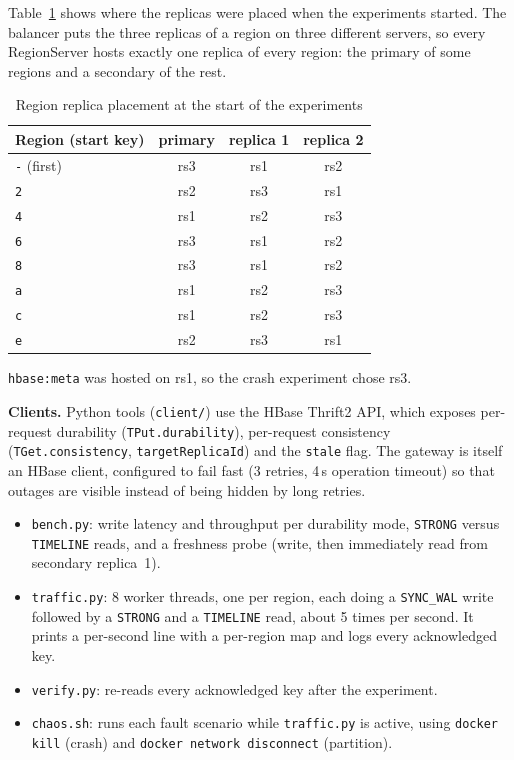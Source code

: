 \documentclass[10pt,twocolumn,letterpaper]{article}
\newcommand{\code}[1]{\texttt{\small #1}}
\begin{document}
Table~\ref{tab:placement} shows where the replicas were placed when the experiments started. The balancer puts the three replicas of a region on three different servers, so every RegionServer hosts exactly one replica of every region: the primary of some regions and a secondary of the rest.

\begin{table}[t]
\caption{Region replica placement at the start of the experiments}\label{tab:placement}
\small
\begin{tabularx}{\columnwidth}{@{}Xccc@{}}
\toprule
Region (start key) & primary & replica 1 & replica 2 \\
\midrule
\code{-} (first) & rs3 & rs1 & rs2 \\
\code{2} & rs2 & rs3 & rs1 \\
\code{4} & rs1 & rs2 & rs3 \\
\code{6} & rs3 & rs1 & rs2 \\
\code{8} & rs3 & rs1 & rs2 \\
\code{a} & rs1 & rs2 & rs3 \\
\code{c} & rs1 & rs2 & rs3 \\
\code{e} & rs2 & rs3 & rs1 \\
\bottomrule
\end{tabularx}
\footnotesize \code{hbase:meta} was hosted on rs1, so the crash experiment chose rs3.
\end{table}

\textbf{Clients.} Python tools (\code{client/}) use the HBase Thrift2 API, which exposes per-request durability (\code{TPut.durability}), per-request consistency (\code{TGet.consistency}, \code{targetReplicaId}) and the \code{stale} flag. The gateway is itself an HBase client, configured to fail fast (3 retries, 4\,s operation timeout) so that outages are visible instead of being hidden by long retries.
\begin{itemize}
\item \code{bench.py}: write latency and throughput per durability mode, \code{STRONG} versus \code{TIMELINE} reads, and a freshness probe (write, then immediately read from secondary replica~1).
\item \code{traffic.py}: 8 worker threads, one per region, each doing a \code{SYNC\_WAL} write followed by a \code{STRONG} and a \code{TIMELINE} read, about 5 times per second. It prints a per-second line with a per-region map and logs every acknowledged key.
\item \code{verify.py}: re-reads every acknowledged key after the experiment.
\item \code{chaos.sh}: runs each fault scenario while \code{traffic.py} is active, using \code{docker kill} (crash) and \code{docker network disconnect} (partition).
\end{itemize}
\end{document}
